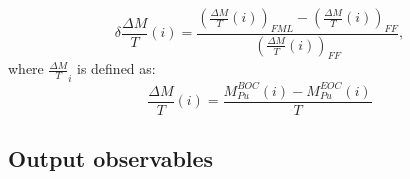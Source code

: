 \begin{equation}
    \delta{\frac{\Delta M}{T}}(i) =
        \frac{\left(\frac{\Delta M}{T}(i)\right)_{FML}
              - \left(\frac{\Delta M}{T}(i)\right)_{FF}}
             {\left(\frac{\Delta M}{T}(i)\right)_{FF}},
\end{equation}
where $\frac{\Delta M}{T}_{i}$ is defined as:
\begin{equation}
    \frac{\Delta M}{T}(i) = \frac{M_{Pu}^{BOC}(i) -
    M_{Pu}^{EOC}(i)}{T}
\end{equation}

\subsection{Output observables}


